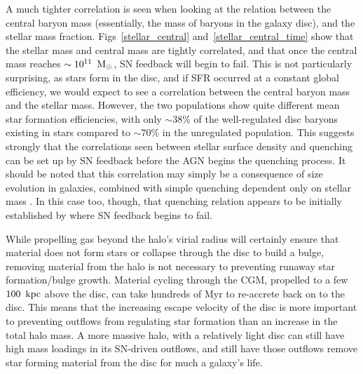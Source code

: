 A much tighter correlation is seen when looking at the relation between the
central baryon mass (essentially, the mass of baryons in the galaxy disc), and
the stellar mass fraction.  Figs~\ref{stellar_central}
and~\ref{stellar_central_time} show that the stellar mass and central mass are
tightly correlated, and that once the central mass reaches $\sim10^{11}\;\>{\rm M_{\odot}}$,
SN feedback will begin to fail.  This is not particularly surprising, as stars
form in the disc, and if SFR occurred at a constant global efficiency, we would
expect to see a correlation between the central baryon mass and the stellar
mass.  However, the two populations show quite different mean star formation
efficiencies, with only $\sim38\%$ of the well-regulated disc baryons existing
in stars compared to $\sim70\%$ in the unregulated population.  This suggests
strongly that the correlations seen between stellar surface density and
quenching \citep{Fang2013} can be set up by SN 
feedback before the AGN begins the quenching process.  It should be noted that
this correlation may simply be a consequence of size evolution
in galaxies, combined with simple quenching dependent only on stellar mass
\citep{Peng2010,Lilly2016}.  In this case too, though, that quenching relation
appears to be initially established by where SN feedback begins to fail.

While propelling
gas beyond the halo's virial radius will certainly ensure that material does not
form stars or collapse through the disc to build a bulge, removing material from
the halo is not necessary to preventing runaway star formation/bulge growth.
Material cycling through the CGM, propelled to a few $100\;\>{\rm kpc}$ above the disc,
can take hundreds of Myr to re-accrete back on to the disc.  This means that the
increasing escape velocity of the disc is more important to preventing outflows
from regulating star formation than an increase in the total halo mass.  A more
massive halo, with a relatively light disc can still have high mass loadings in
its SN-driven outflows, and still have those outflows remove star forming
material from the disc for much a galaxy's life.

